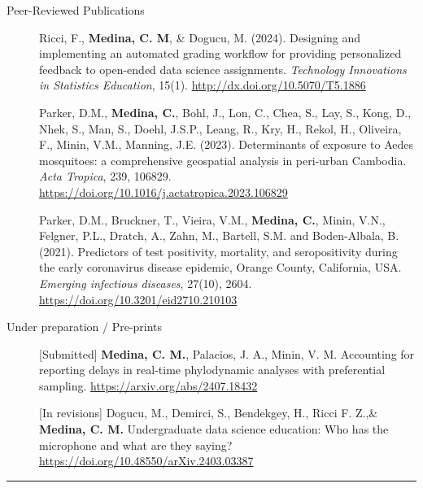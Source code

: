 \documentclass{article}
\begin{document}
	
	\begin{description}
		\vspace{-2mm}
		\item[Peer-Reviewed Publications]\hspace*{.1in}
		
		Ricci, F., \textbf{Medina, C. M}, \& Dogucu, M. (2024). Designing and implementing an automated grading workflow for providing personalized feedback to open-ended data science assignments. \textit{Technology Innovations in Statistics Education}, 15(1).
		\url{http://dx.doi.org/10.5070/T5.1886}
		
		Parker, D.M., \textbf{Medina, C.}, Bohl, J., Lon, C., Chea, S., Lay, S., Kong, D., Nhek, S., Man, S., Doehl, J.S.P., Leang, R., Kry, H., Rekol, H., Oliveira, F., Minin, V.M., Manning, J.E. (2023). Determinants of exposure to Aedes mosquitoes: a comprehensive geospatial analysis in peri-urban Cambodia. \textit{Acta Tropica}, 239, 106829. \url{https://doi.org/10.1016/j.actatropica.2023.106829}
		
		Parker, D.M., Bruckner, T., Vieira, V.M., \textbf{Medina, C.}, Minin, V.N., Felgner, P.L., Dratch, A., Zahn, M., Bartell, S.M. and Boden-Albala, B. (2021). Predictors of test positivity, mortality, and seropositivity during the early coronavirus disease epidemic, Orange County, California, USA. \textit{Emerging infectious diseases}, 27(10), 2604. \url{https://doi.org/10.3201/eid2710.210103}
		
		\item[Under preparation / Pre-prints]\hspace*{.1in}
		
		[Submitted] \textbf{Medina, C. M.}, Palacios, J. A., Minin, V. M. Accounting for reporting delays in real-time phylodynamic analyses with preferential sampling. \url{https://arxiv.org/abs/2407.18432}
		
		[In revisions] Dogucu, M., Demirci, S., Bendekgey, H., Ricci F. Z.,\& \textbf{Medina, C. M.} Undergraduate data science education: Who has the microphone and what are they saying?\url{https://doi.org/10.48550/arXiv.2403.03387}
		
	\end{description}
	\vspace{-2mm}
	\rule{\linewidth}{1pt}
	
	
	
	
\end{document}
